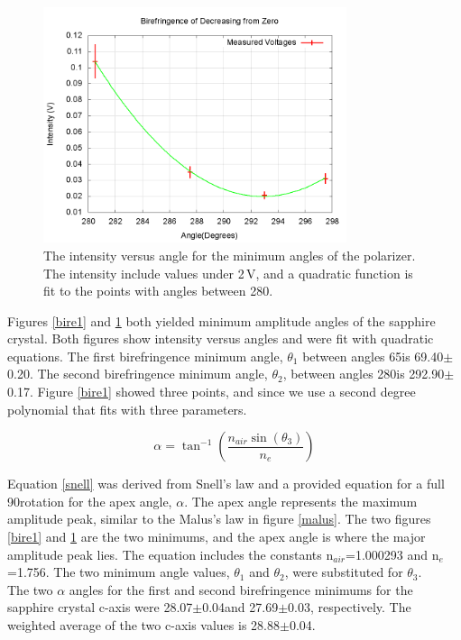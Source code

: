 \documentclass[aps,prl,twocolumn,superscriptaddress,nofootinbib]{revtex4-1}
\begin{document}
\begin{figure}[h!]
  \begin{center}
\centerline{\includegraphics[width=3.5in]{bire2.png}}
\caption{\small{The intensity versus angle for the minimum angles of the polarizer. The intensity include values under 2\,V, and a quadratic function is fit to the points with angles between 280\degree. \label{bire2}}}
  \end{center}
\end{figure}
\vspace{.7cm}

Figures \ref{bire1} and \ref{bire2} both yielded minimum amplitude angles of the sapphire crystal. Both figures show intensity versus angles and were fit with quadratic equations. The first birefringence minimum angle, $\theta$$_1$ between angles 65\degree is 69.40\degree$\pm$0.20\degree. The second birefringence minimum angle, $\theta$$_2$, between angles 280\degree is 292.90\degree$\pm$0.17\degree. Figure \ref{bire1} showed three points, and since we use a second degree polynomial that fits with three parameters.

\begin{equation}
\alpha=\tan^{-1}\left(\frac{n_{air}\sin(\theta_3)}{n_e}\right)
\label{snell}
\end{equation}

Equation \ref{snell} was derived from Snell's law and a provided equation for a full 90\degree rotation for the apex angle, $\alpha$. The apex angle represents the maximum amplitude peak, similar to the Malus's law in figure \ref{malus}. The two figures \ref{bire1} and \ref{bire2} are the two minimums, and the apex angle is where the major amplitude peak lies. The equation includes the constants n$_{air}$=1.000293 and n$_e$=1.756. The two minimum angle values, $\theta$$_1$ and $\theta$$_2$, were substituted for $\theta_3$.
\\
\indent The two $\alpha$ angles for the first and second birefringence minimums for the sapphire crystal c-axis were 28.07\degree$\pm$0.04\degree and 27.69\degree$\pm$0.03\degree, respectively. The weighted average of the two c-axis values is 28.88\degree$\pm$0.04\degree.
\end{document}
